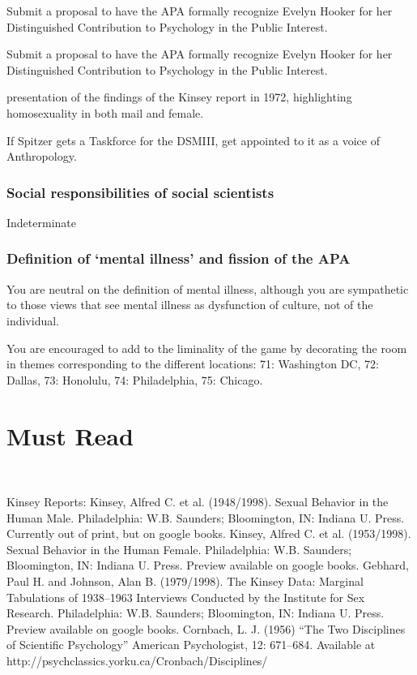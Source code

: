\begin{refsection}
\begin{proposal}[Gebhard]\label{proposal:gebhard}
Submit a proposal to have the APA formally recognize Evelyn Hooker for her Distinguished Contribution to Psychology in the Public Interest.\end{proposal}

Submit a proposal to have the APA formally recognize Evelyn Hooker for her Distinguished Contribution to Psychology in the Public Interest.

\begin{writingtask}[Gebhard]\label{writingtask:gebhard}
presentation of the findings of the Kinsey report in 1972, highlighting homosexuality in both mail and female. 
\end{writingtask}

If Spitzer gets a Taskforce for the DSMIII, get appointed to it as a voice of Anthropology.

\subsubsection{Social responsibilities of social scientists}
\label{socialresponsibilitiesofsocialscientists}

Indeterminate

\subsubsection{Definition of ‘mental illness’ and fission of the APA}
\label{definitionof‘mentalillness’andfissionoftheapa}

You are neutral on the definition of mental illness, although you are sympathetic to those views that see mental illness as dysfunction of culture, not of the individual. 

You are encouraged to add to the liminality of the game by decorating the room in themes corresponding to the different locations: 71: Washington DC, 72: Dallas, 73: Honolulu, 74: Philadelphia, 75: Chicago.

\section{Must Read}
\label{mustread}

~\citep{Mead:1928uk}

Kinsey Reports:
Kinsey, Alfred C. et al. (1948\slash 1998). Sexual Behavior in the Human Male. Philadelphia: W.B. Saunders; Bloomington, IN: Indiana U. Press. Currently out of print, but on google books.
Kinsey, Alfred C. et al. (1953\slash 1998). Sexual Behavior in the Human Female. Philadelphia: W.B. Saunders; Bloomington, IN: Indiana U. Press. Preview available on google books.
Gebhard, Paul H. and Johnson, Alan B. (1979\slash 1998). The Kinsey Data: Marginal Tabulations of 1938--1963 Interviews Conducted by the Institute for Sex Research. Philadelphia: W.B. Saunders; Bloomington, IN: Indiana U. Press. Preview available on google books.
Cornbach, L. J. (1956) “The Two Disciplines of Scientific Psychology” American Psychologist, 12: 671--684. Available at http:\slash \slash psychclassics.yorku.ca\slash Cronbach\slash Disciplines\slash 


\end{refsection}
